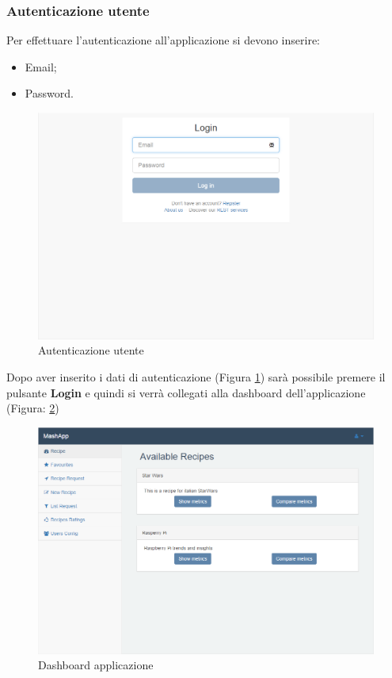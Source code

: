 		\subsubsection{Autenticazione utente} %
		\label{sec:autenticazione_utente}
			Per effettuare l'autenticazione\gloss{} all'applicazione si devono inserire:
			\begin{itemize}
				\item Email;
				\item Password.
			\end{itemize}
			\begin{figure}[H]
				\centering
				\centerline{\includegraphics[width=14cm]{images/autenticazione_utente.png}}
				\caption{Autenticazione utente}
				\label{fig:registrazione_utente_accesso}
			\end{figure}
			Dopo aver inserito i dati di autenticazione (Figura \ref{fig:registrazione_utente_accesso}) sarà possibile premere il pulsante \textbf{Login}\gloss{} e quindi si verrà collegati alla dashboard\gloss{} dell'applicazione (Figura: \ref{fig:dashboard})
			\begin{figure}[H]
				\centering
				\centerline{\includegraphics[width=19cm]{images/dashboard_amministratore.png}}
				\caption{Dashboard applicazione}
				\label{fig:dashboard}
			\end{figure}



